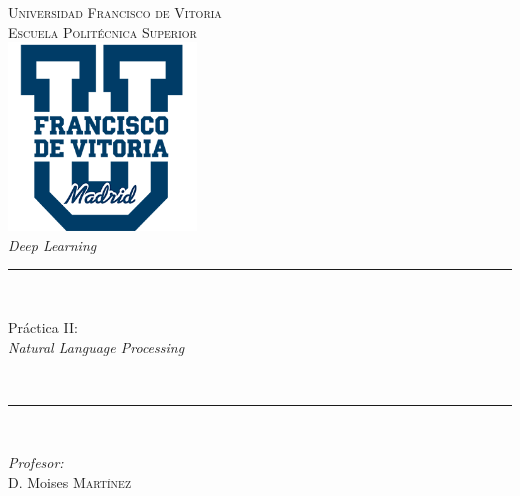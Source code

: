 \begin{titlepage}
    \newcommand{\HRule}{\rule{\linewidth}{0.5mm}} 

    \center 
     
    
    \textsc{\LARGE Universidad Francisco de Vitoria}\\[1cm] 
    \textsc{\LARGE Escuela Politécnica Superior}\\[1.5cm] 
    
    \includegraphics[width=5cm]{ImagenesLatex/ufv_logo.png}\\[1cm] 
    \Large \textit{Deep Learning}\\[0.5cm]
    
    
    
    \HRule \\[0.6cm]
    {\huge \bfseries
    \parbox[c]{\textwidth}{\centering Práctica II: \\ \textit{Natural Language Processing}}
    }
    \\[0.6cm]
    \HRule \\[1.25cm]
    
     
    
    \begin{minipage}{0.3\textwidth}
    \begin{flushleft} \large
    \emph{Profesor:}\\
    D. Moises \textsc{Martínez}\\ 
    \end{flushleft}


\end{minipage}
\end{titlepage}

